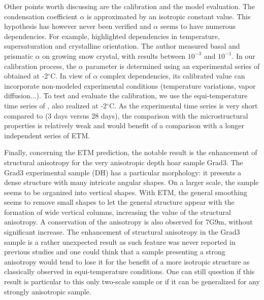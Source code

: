 \documentclass[draft,ms]{agujournal2019}
\begin{document}
Other points worth discussing are the calibration and the model evaluation. The condensation coefficient $\alpha$ is approximated by an isotropic constant value. This hypothesis has however never been verified and $\alpha$ seems to have numerous dependencies. For example,  highlighted dependencies in temperature, supersaturation and crystalline orientation. The author measured basal and prismatic $\alpha$ on growing snow crystal, with results between $10^{-3}$ and $10^{-1}$.
In our calibration process, the $\alpha$ parameter is determined using an experimental series of  obtained at -2$^\circ$C. In view of $\alpha$ complex dependencies, its calibrated value can incorporate non-modeled experimental conditions (temperature variations, vapor diffusion...).
To test and evaluate the calibration, we use the equi-temperature time series of , also realized at -2$^\circ$C. As the experimental time series is very short compared to  (3 days versus 28 days), the comparison with the microstructural properties is relatively weak and would benefit of a comparison with a longer independent series of ETM. 

Finally, concerning the ETM prediction, the notable result is the enhancement of structural anisotropy for the very anisotropic depth hoar sample Grad3. The Grad3 experimental sample (DH) has a particular morphology: it presents a dense structure with many intricate angular shapes. On a larger scale, the sample seems to be organized into vertical shapes. With ETM, the general smoothing seems to remove small shapes to let the general structure appear with the formation of wide vertical columns, increasing the value of the structural anisotropy. A conservation of the anisotropy is also observed for 7G9m, without significant increase. The enhancement of structural anisotropy in the Grad3 sample is a rather unexpected result as such feature was never reported in previous studies and one could think that a sample presenting a strong anisotropy would tend to lose it for the benefit of a more isotropic structure as classically observed in equi-temperature conditions. One can still question if this result is particular to this only two-scale sample or if it can be generalized for any strongly anisotropic sample. 
\end{document}
